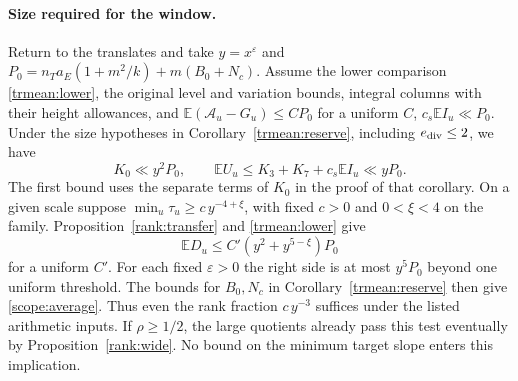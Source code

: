 \paragraph{Size required for the window.}
Return to the translates and take \(y=x^\varepsilon\) and
\(P_0=n_Ta_E(1+m^2/k)+m(B_0+N_c)\). Assume the lower comparison
\eqref{trmean:lower}, the original level and variation bounds,
integral columns with their height allowances, and
\(\mathbb E(\mathcal A_u-G_u)\le C P_0\) for a uniform \(C\),
\(c_s\mathbb E I_u\ll P_0\). Under the size hypotheses in
Corollary~\ref{trmean:reserve}, including \(e_{\rm div}\le2\), we have
\[
 K_0\ll y^2P_0,\qquad
 \mathbb E U_u\le K_3+K_7+c_s\mathbb E I_u\ll yP_0 .
\]
The first bound uses the separate terms of \(K_0\) in the proof
of that corollary. On a given scale suppose
\(\min_u\tau_u\ge c\,y^{-4+\xi}\), with fixed \(c>0\) and
\(0<\xi<4\) on the family. Proposition~\ref{rank:transfer} and
\eqref{trmean:lower} give
\[
          \mathbb E D_u\le C'(y^2+y^{5-\xi})P_0
\]
for a uniform \(C'\). For each fixed \(\varepsilon>0\) the right side is at most \(y^5P_0\)
beyond one uniform threshold. The bounds for \(B_0,N_c\) in
Corollary~\ref{trmean:reserve} then give \eqref{scope:average}.
Thus even the rank fraction \(c\,y^{-3}\) suffices under the listed
arithmetic inputs. If \(\rho\ge1/2\), the large quotients already
pass this test eventually by Proposition~\ref{rank:wide}.
No bound on the minimum target slope enters this implication.

